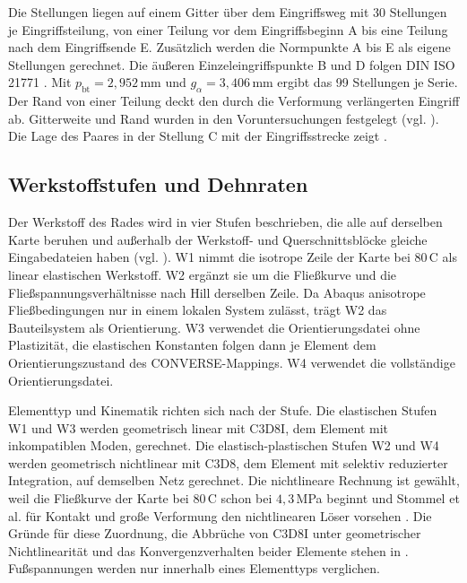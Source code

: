 
Die Stellungen liegen auf einem Gitter über dem Eingriffsweg mit 30 Stellungen je Eingriffsteilung, von einer Teilung vor dem Eingriffsbeginn A bis eine Teilung nach dem Eingriffsende E. Zusätzlich werden die Normpunkte A bis E als eigene Stellungen gerechnet. Die äußeren Einzeleingriffspunkte B und D folgen DIN ISO 21771 \cite{DINISO21771}. Mit $p_{\mathrm{bt}} = 2{,}952$\,mm und $g_{\alpha} = 3{,}406$\,mm ergibt das 99 Stellungen je Serie. Der Rand von einer Teilung deckt den durch die Verformung verlängerten Eingriff ab. Gitterweite und Rand wurden in den Voruntersuchungen festgelegt (vgl. ). Die Lage des Paares in der Stellung C mit der Eingriffsstrecke zeigt .

\subsection{Werkstoffstufen und Dehnraten}
\label{sec:werkstoffstufen}

Der Werkstoff des Rades wird in vier Stufen beschrieben, die alle auf derselben Karte beruhen und außerhalb der Werkstoff- und Querschnittsblöcke gleiche Eingabedateien haben (vgl. ). W1 nimmt die isotrope Zeile der Karte bei $80$\,\textdegree C als linear elastischen Werkstoff. W2 ergänzt sie um die Fließkurve und die Fließspannungsverhältnisse nach Hill derselben Zeile. Da Abaqus anisotrope Fließbedingungen nur in einem lokalen System zulässt, trägt W2 das Bauteilsystem als Orientierung. W3 verwendet die Orientierungsdatei ohne Plastizität, die elastischen Konstanten folgen dann je Element dem Orientierungszustand des CONVERSE-Mappings. W4 verwendet die vollständige Orientierungsdatei.

Elementtyp und Kinematik richten sich nach der Stufe. Die elastischen Stufen W1 und W3 werden geometrisch linear mit C3D8I, dem Element mit inkompatiblen Moden, gerechnet. Die elastisch-plastischen Stufen W2 und W4 werden geometrisch nichtlinear mit C3D8, dem Element mit selektiv reduzierter Integration, auf demselben Netz gerechnet. Die nichtlineare Rechnung ist gewählt, weil die Fließkurve der Karte bei $80$\,\textdegree C schon bei $4{,}3$\,MPa beginnt und Stommel et al. für Kontakt und große Verformung den nichtlinearen Löser vorsehen \cite[S.~474]{Sto18}. Die Gründe für diese Zuordnung, die Abbrüche von C3D8I unter geometrischer Nichtlinearität und das Konvergenzverhalten beider Elemente stehen in . Fußspannungen werden nur innerhalb eines Elementtyps verglichen.

